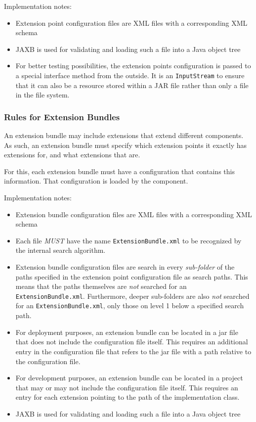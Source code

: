 Implementation notes:
\begin{itemize}
	\item Extension point configuration files are XML files with a corresponding XML schema
	\item JAXB is used for validating and loading such a file into a Java object tree
	\item For better testing possibilities, the extension points configuration is passed to a special interface method from the outside. It is an \texttt{InputStream} to ensure that it can also be a resource stored within a JAR file rather than only a file in the file system.
\end{itemize}


\subsubsection{Rules for Extension Bundles}
\label{sec:RulesforExtensionBundles}

An extension bundle may include extensions that extend different \LibName{} components. As such, an extension bundle must specify which extension points it exactly has extensions for, and what extensions that are.

For this, each extension bundle must have a configuration that contains this information. That configuration is loaded by the \COMPextensionManagement{} component.

Implementation notes:
\begin{itemize}
	\item Extension bundle configuration files are XML files with a corresponding XML schema
	\item Each file \emph{MUST} have the name \texttt{ExtensionBundle.xml} to be recognized by the internal search algorithm.
	\item Extension bundle configuration files are search in every \emph{sub-folder} of the paths specified in the extension point configuration file as search paths. This means that the paths themselves are \emph{not} searched for an \texttt{ExtensionBundle.xml}. Furthermore, deeper sub-folders are also \emph{not} searched for an \texttt{ExtensionBundle.xml}, only those on level 1 below a specified search path.
	\item For deployment purposes, an extension bundle can be located in a jar file that does not include the configuration file itself. This requires an additional entry in the configuration file that refers to the jar file with a path relative to the configuration file.
	\item For development purposes, an extension bundle can be located in a project that may or may not include the configuration file itself. This requires an entry for each extension pointing to the path of the implementation class.
	\item JAXB is used for validating and loading such a file into a Java object tree
\end{itemize}

